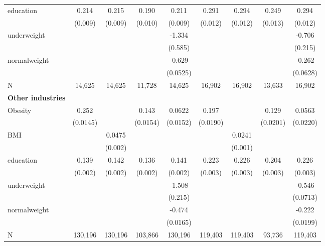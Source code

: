 \documentclass{article}
\begin{document}
\begin{center}
{{\begin{tabular}{lcccccccc}
education &0.214\textnormal{\superscript{***}} & 0.215\textnormal{\superscript{***}} & 0.190\textnormal{\superscript{***}} & 0.211\textnormal{\superscript{***}}& 0.291\textnormal{\superscript{***}} & 0.294\textnormal{\superscript{***}} & 0.249\textnormal{\superscript{***}} & 0.294\textnormal{\superscript{***}} \\
& (0.009)& (0.009) & (0.010) &(0.009)&(0.012) & (0.012) & (0.013) &(0.012)\\
underweight & & & & -1.334\textnormal{\superscript{**}} & & & & -0.706\textnormal{\superscript{***}} \\
& & & & (0.585) & & & & (0.215)\\
normalweight & & & & -0.629\textnormal{\superscript{***}} & & & & -0.262\textnormal{\superscript{***}} \\
& & & & (0.0525) & & & & (0.0628) \\
N & 14,625 & 14,625 & 11,728 & 14,625 & 16,902 & 16,902 & 13,633 & 16,902 \\
\hline
\bf{Other industries} & & & & & & & & \\
Obesity & 0.252\textnormal{\superscript{***}} & & 0.143\textnormal{\superscript{***}} & 0.0622\textnormal{\superscript{***}} & 0.197\textnormal{\superscript{***}} & & 
0.129\textnormal{\superscript{***}} & 0.0563\textnormal{\superscript{**}} \\
& (0.0145) & & (0.0154) & (0.0152) & (0.0190)& & (0.0201) & (0.0220) \\
BMI & & 0.0475\textnormal{\superscript{***}} & & & & 
0.0241\textnormal{\superscript{***}} & & \\
& & (0.002) & &  && (0.001) && \\
education &0.139\textnormal{\superscript{***}} & 0.142\textnormal{\superscript{***}} & 0.136\textnormal{\superscript{***}} & 0.141\textnormal{\superscript{***}}& 0.223\textnormal{\superscript{***}} & 0.226\textnormal{\superscript{***}} & 0.204\textnormal{\superscript{***}} & 0.226\textnormal{\superscript{***}} \\
& (0.002)& (0.002) & (0.002) &(0.002)&(0.003) & (0.003) & (0.003) &(0.003)\\
underweight & & & & -1.508\textnormal{\superscript{***}} & & & & -0.546\textnormal{\superscript{***}} \\
& & & & (0.215) & & & & (0.0713)\\
normalweight & & & & -0.474\textnormal{\superscript{***}} & & & & -0.222\textnormal{\superscript{***}} \\
& & & & (0.0165) & & & & (0.0199) \\
N & 130,196 & 130,196 & 103,866 & 130,196 & 119,403 & 119,403 & 93,736 & 119,403 \\
\end{tabular}}}
\end{center}
\end{document}
